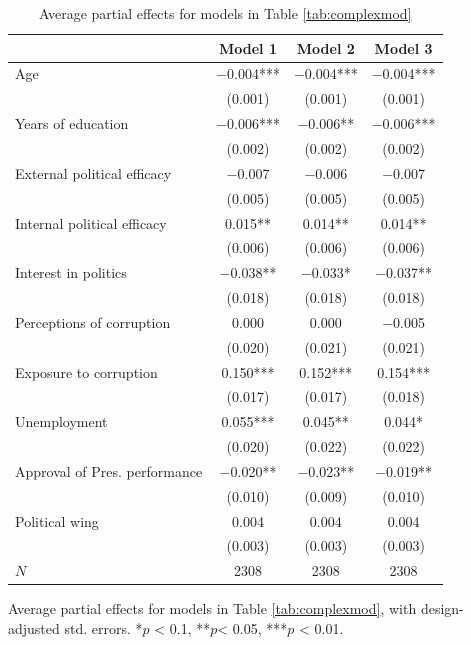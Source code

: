\documentclass[12pt,a4]{article}\usepackage[]{graphicx}\usepackage[]{xcolor}
\begin{document}
\begin{table}[htbp]
\begin{center}
\caption{Average partial effects for models in Table \ref{tab:complexmod}}
\label{tab:apescomp}

\begin{tabular}[t]{lccc}
\toprule
  & Model 1 & Model 2 & Model 3\\
\midrule
Age & \num{-0.004}*** & \num{-0.004}*** & \num{-0.004}***\\
 & (\num{0.001}) & (\num{0.001}) & (\num{0.001})\\
Years of education & \num{-0.006}*** & \num{-0.006}** & \num{-0.006}***\\
 & (\num{0.002}) & (\num{0.002}) & (\num{0.002})\\
External political efficacy & \num{-0.007} & \num{-0.006} & \num{-0.007}\\
 & (\num{0.005}) & (\num{0.005}) & (\num{0.005})\\
Internal political efficacy & \num{0.015}** & \num{0.014}** & \num{0.014}**\\
 & (\num{0.006}) & (\num{0.006}) & (\num{0.006})\\
Interest in politics & \num{-0.038}** & \num{-0.033}* & \num{-0.037}**\\
 & (\num{0.018}) & (\num{0.018}) & (\num{0.018})\\
Perceptions of corruption & \num{0.000} & \num{0.000} & \num{-0.005}\\
 & (\num{0.020}) & (\num{0.021}) & (\num{0.021})\\
Exposure to corruption & \num{0.150}*** & \num{0.152}*** & \num{0.154}***\\
 & (\num{0.017}) & (\num{0.017}) & (\num{0.018})\\
Unemployment & \num{0.055}*** & \num{0.045}** & \num{0.044}*\\
 & (\num{0.020}) & (\num{0.022}) & (\num{0.022})\\
Approval of Pres. performance & \num{-0.020}** & \num{-0.023}** & \num{-0.019}**\\
 & (\num{0.010}) & (\num{0.009}) & (\num{0.010})\\
Political wing & \num{0.004} & \num{0.004} & \num{0.004}\\
 & (\num{0.003}) & (\num{0.003}) & (\num{0.003})\\
\midrule
$N$ & \num{2308} & \num{2308} & \num{2308}\\
\bottomrule
\end{tabular}


\end{center}
Average partial effects for models in Table \ref{tab:complexmod}, with design-adjusted std. errors. *$p$ < 0.1, **$p$< 0.05, ***$p$ < 0.01.
\end{table}
\end{document}
